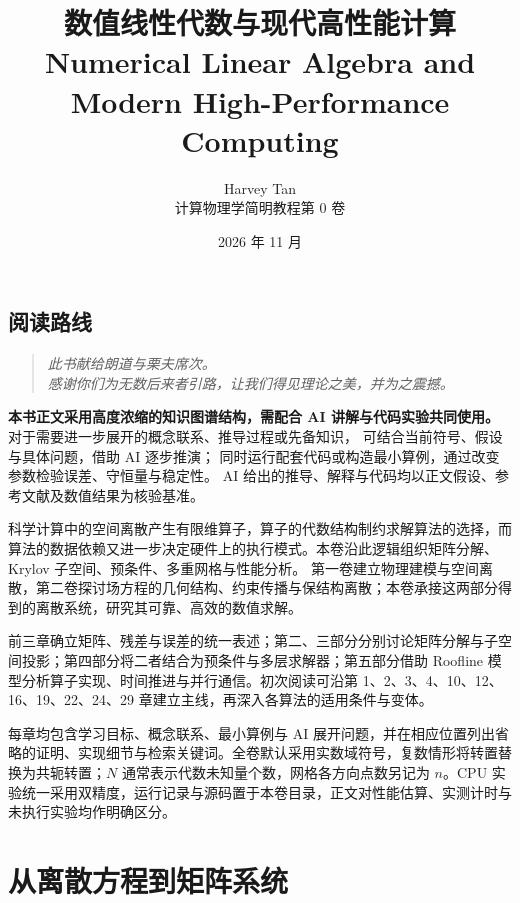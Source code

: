 \documentclass[11pt,openany]{ctexbook}
\title{数值线性代数与现代高性能计算\\[0.6em]\large Numerical Linear Algebra and Modern High-Performance Computing}
\author{Harvey Tan\\[0.6em]\large 计算物理学简明教程\quad 第 0 卷}
\date{2026 年 11 月}
\begin{document}
\frontmatter
\maketitle
\chapter*{阅读路线}
\begin{quote}
\itshape
此书献给朗道与栗夫席次。\\
感谢你们为无数后来者引路，让我们得见理论之美，并为之震撼。
\end{quote}
\begin{tcolorbox}[colback=red!3,colframe=red!65!black,title={使用说明：AI 讲解与代码实验},fonttitle=\bfseries,boxrule=0.8pt,arc=1mm,breakable]
\textbf{本书正文采用高度浓缩的知识图谱结构，需配合 AI 讲解与代码实验共同使用。}
对于需要进一步展开的概念联系、推导过程或先备知识，
可结合当前符号、假设与具体问题，借助 AI 逐步推演；
同时运行配套代码或构造最小算例，通过改变参数检验误差、守恒量与稳定性。
AI 给出的推导、解释与代码均以正文假设、参考文献及数值结果为核验基准。
\end{tcolorbox}
科学计算中的空间离散产生有限维算子，算子的代数结构制约求解算法的选择，而算法的数据依赖又进一步决定硬件上的执行模式。本卷沿此逻辑组织矩阵分解、Krylov 子空间、预条件、多重网格与性能分析。
第一卷建立物理建模与空间离散，第二卷探讨场方程的几何结构、约束传播与保结构离散；本卷承接这两部分得到的离散系统，研究其可靠、高效的数值求解。
\par
前三章确立矩阵、残差与误差的统一表述；第二、三部分分别讨论矩阵分解与子空间投影；第四部分将二者结合为预条件与多层求解器；第五部分借助 Roofline 模型分析算子实现、时间推进与并行通信。初次阅读可沿第 1、2、3、4、10、12、16、19、22、24、29 章建立主线，再深入各算法的适用条件与变体。
\par
每章均包含学习目标、概念联系、最小算例与 AI 展开问题，并在相应位置列出省略的证明、实现细节与检索关键词。全卷默认采用实数域符号，复数情形将转置替换为共轭转置；$N$ 通常表示代数未知量个数，网格各方向点数另记为 $n$。CPU 实验统一采用双精度，运行记录与源码置于本卷目录，正文对性能估算、实测计时与未执行实验均作明确区分。
\tableofcontents
\mainmatter
\part{从离散方程到矩阵系统}



\end{document}
